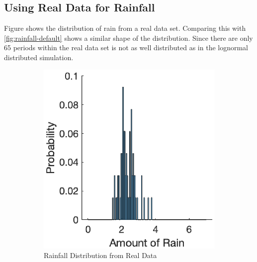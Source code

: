 \documentclass[12pt, a4paper, oneside]{article}
\begin{document}
\subsection{Using Real Data for Rainfall}
Figure  shows the distribution of rain from a real data set.
Comparing this with \ref{fig:rainfall-default} shows a similar shape of the distribution. 
Since there are only 65 periods within the real data set is not as well distributed as in the lognormal distributed simulation.
\begin{figure}[h]
\begin{subfigure}{0.5\textwidth}
	\centering
	\includegraphics[width=1\textwidth]{figures/rainfall-real-data.eps}
	\caption{Rainfall Distribution from Real Data}
	\label{fig:rainfall-real-data}
\end{subfigure}%
\begin{subfigure}{.5\textwidth}
	\centering

\end{subfigure}
\end{figure}
\end{document}
